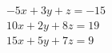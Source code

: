 \documentclass[preview]{standalone}
\begin{document}
\begin{align*}
\begin{array}{r}{-5x+3y+z=-15}\\ {10x+2y+8z=19}\\ {15x+5y+7z=9}\end{array}
\end{align*}
\end{document}
